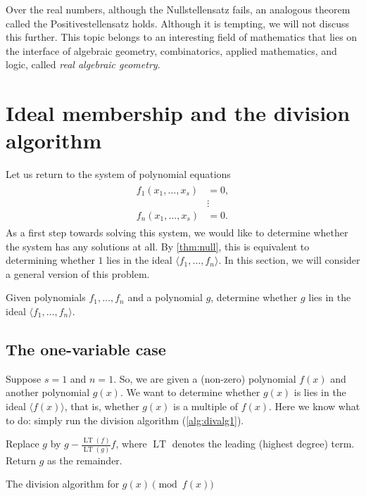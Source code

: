 \documentclass[11pt]{article}
\DeclareMathOperator{\LT}{LT}
\begin{document}
\begin{remark}
  Over the real numbers, although the Nullstellensatz fails, an analogous theorem called the Positivestellensatz holds.
  Although it is tempting, we will not discuss this further.
  This topic belongs to an interesting field of mathematics that lies on the interface of algebraic geometry, combinatorics, applied mathematics, and logic, called \emph{real algebraic geometry}.
\end{remark}

\section{Ideal membership and the division algorithm}
Let us return to the system of polynomial equations
\begin{align}\label{eqn:system1}
  \begin{split}
  f_1(x_1, \dots, x_s) &= 0,\\
  &\vdots\\
  f_n(x_1, \dots, x_s) &= 0.
\end{split}
\end{align}
As a first step towards solving this system, we would like to determine whether the system has any solutions at all.
By \autoref{thm:null}, this is equivalent to determining whether $1$ lies in the ideal $\langle  f_1, \dots, f_n \rangle$.
In this section, we will consider a general version of this problem.
\begin{problem}
  Given polynomials $f_1, \dots, f_n$ and a polynomial $g$, determine whether $g$ lies in the ideal $\langle  f_1, \dots, f_n \rangle$.
\end{problem}

\subsection{The one-variable case}
Suppose $s = 1$ and $n = 1$.
So, we are given a (non-zero) polynomial $f(x)$ and another polynomial $g(x)$.
We want to determine whether $g(x)$ is lies in the ideal $\langle  f(x) \rangle$, that is, whether $g(x)$ is a multiple of $f(x)$.
Here we know what to do: simply run the division algorithm (\autoref{alg:divalg1}).

\begin{algorithm}
  {
    Replace $g$ by $g - \frac{\LT(f)}{\LT(g)} f$, where $\LT$ denotes the leading (highest degree) term.
  }
  Return $g$ as the remainder.
  \bigskip

  \caption{The division algorithm for $g(x) \pmod {f(x)}$}
  \label{alg:divalg1}
\end{algorithm}
\end{document}
